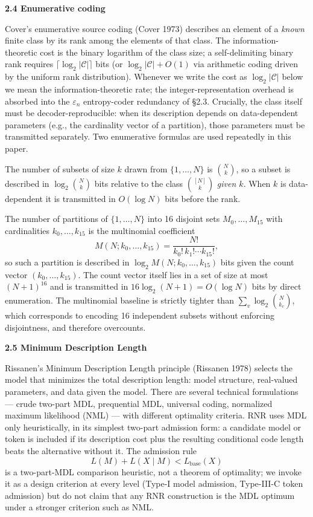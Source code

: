 \documentclass[
]{article}
\begin{document}
\textbf{2.4 Enumerative coding}

Cover's enumerative source coding (Cover 1973) describes an element
of a \emph{known} finite class by its rank among the elements of that
class. The information-theoretic cost is the binary logarithm of the
class size; a self-delimiting binary rank requires
$\lceil \log_2 |\mathcal{C}| \rceil$ bits (or
$\log_2 |\mathcal{C}| + O(1)$ via arithmetic coding driven by the
uniform rank distribution). Whenever we write the cost as
$\log_2 |\mathcal{C}|$ below we mean the information-theoretic rate;
the integer-representation overhead is absorbed into the
$\varepsilon_n$ entropy-coder redundancy of §2.3. Crucially, the
class itself must be decoder-reproducible: when its description
depends on data-dependent parameters (e.g., the cardinality vector
of a partition), those parameters must be transmitted separately.
Two enumerative formulas are used repeatedly in this paper.

The number of subsets of size $k$ drawn from $\{1, \ldots, N\}$ is
$\binom{N}{k}$, so a subset is described in
$\log_2 \binom{N}{k}$ bits relative to the class
$\binom{[N]}{k}$ \emph{given $k$}. When $k$ is data-dependent it is
transmitted in $O(\log N)$ bits before the rank.

The number of partitions of $\{1, \ldots, N\}$ into 16 disjoint sets
$M_0, \ldots, M_{15}$ with cardinalities $k_0, \ldots, k_{15}$ is the
multinomial coefficient
\[
M(N; k_0, \ldots, k_{15}) = \frac{N!}{k_0!\, k_1! \cdots k_{15}!},
\tag{2.2}
\]
so such a partition is described in
$\log_2 M(N; k_0, \ldots, k_{15})$ bits given the count vector
$(k_0, \ldots, k_{15})$. The count vector itself lies in a set of
size at most $(N + 1)^{16}$ and is transmitted in
$16 \log_2(N + 1) = O(\log N)$ bits by direct enumeration. The
multinomial baseline is strictly tighter than
$\sum_v \log_2 \binom{N}{k_v}$, which corresponds to encoding 16
independent subsets without enforcing disjointness, and therefore
overcounts.

\textbf{2.5 Minimum Description Length}

Rissanen's Minimum Description Length principle (Rissanen 1978)
selects the model that minimizes the total description length: model
structure, real-valued parameters, and data given the model. There
are several technical formulations --- crude two-part MDL,
prequential MDL, universal coding, normalized maximum likelihood
(NML) --- with different optimality criteria. RNR uses MDL only
heuristically, in its simplest two-part admission form: a candidate
model or token is included if its description cost plus the resulting
conditional code length beats the alternative without it. The
admission rule
\[
L(M) + L(X \mid M) < L_{\text{base}}(X)
\]
is a two-part-MDL comparison heuristic, not a theorem of optimality;
we invoke it as a design criterion at every level (Type-I model
admission, Type-III-C token admission) but do not claim that any RNR
construction is the MDL optimum under a stronger criterion such as
NML.
\end{document}
